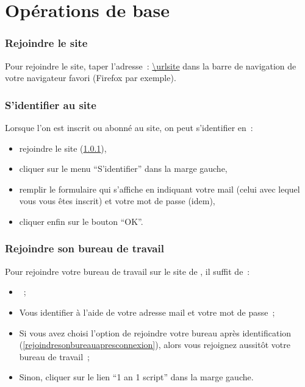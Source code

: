 \chapter{Opérations de base}\label{operationsdebase}


\subsection{Rejoindre le site}\label{rejoindrelesite}

Pour rejoindre le site, taper l'adresse~: {\url{\urlsite}} dans la barre de navigation de votre navigateur favori (Firefox par exemple).

\subsection{S'identifier au site}\label{vousidentifier}

Lorsque l'on est inscrit ou abonné au site, on peut s'identifier en~:

\begin{itemize}
  \item rejoindre le site (\ref{rejoindrelesite}),
  \item cliquer sur le menu \enquote{S'identifier} dans la marge gauche,
  \item remplir le formulaire qui s'affiche en indiquant votre mail (celui avec lequel vous vous êtes inscrit) et votre mot de passe (idem),
  \item cliquer enfin sur le bouton \enquote{OK}.
\end{itemize}

\subsection{Rejoindre son bureau de travail} %
\label{rejoindrebureau}

Pour rejoindre votre bureau de travail sur le site de \boa{}, il suffit de~:

\begin{itemize}
  \item \rejoindreLeSite{}~;
  \item Vous identifier à l'aide de votre adresse mail et votre mot de passe~;
  \item Si vous avez choisi l'option de rejoindre votre bureau après identification (\ref{rejoindresonbureauapresconnexion}), alors vous rejoignez aussitôt votre bureau de travail~;
  \item Sinon, cliquer sur le lien \enquote{1 an 1 script} dans la marge gauche.
\end{itemize}